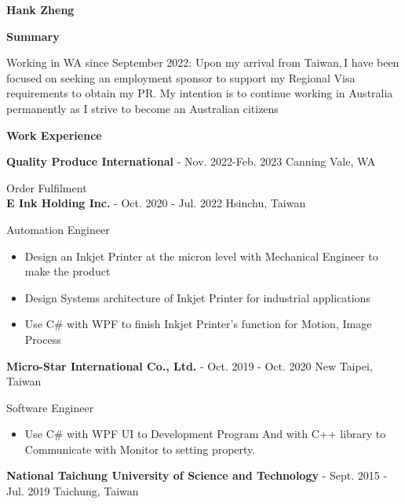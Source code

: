 \documentclass[11pt a4paper]{article}
\begin{document}
\begin{Huge}
\textbf{Hank Zheng}\\
\end{Huge}


\begin{LARGE}
\textbf{Summary
\hrulefill
}
\end{LARGE}

Working in WA since September 2022:  Upon my arrival from Taiwan,\,I have been focused on seeking an employment sponsor to support my Regional Visa requirements to obtain my PR. My intention is to continue working in Australia permanently as  I strive to become an Australian citizens \\

\begin{LARGE}


\textbf{Work Experience
\hrulefill
}
\end{LARGE}

\textbf{Quality Produce International} - Nov. 2022-Feb. 2023 Canning Vale, WA 

Order Fulfilment\\

\textbf{E Ink Holding Inc.} - Oct. 2020 - Jul. 2022 Hsinchu, Taiwan

Automation Engineer
\begin{itemize}
        \item {Design an Inkjet Printer at the micron level with Mechanical Engineer to make the product}
        \item {Design Systems architecture of Inkjet Printer for  industrial applications}
        \item {Use C\# with WPF to finish Inkjet Printer's function for Motion, Image Process}
\end{itemize}

\textbf{Micro-Star International Co., Ltd.} - Oct. 2019 - Oct. 2020 New Taipei, Taiwan 

Software Engineer
\begin{itemize}
\item {Use C\# with WPF UI to Development Program And with C++ library to Communicate with Monitor to setting property.}
\end{itemize} 
\textbf{National Taichung University of Science and Technology} - Sept. 2015 - Jul. 2019 Taichung, Taiwan
\end{document}
